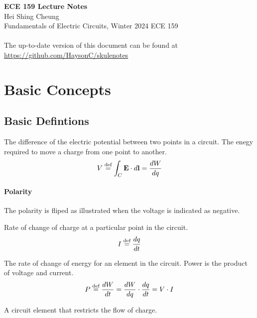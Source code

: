 \documentclass[11pt]{article}
\begin{document}
\thispagestyle{empty}
{\LARGE \bf ECE 159 Lecture Notes}\\
{\large Hei Shing Cheung}\\
Fundamentals of Electric Circuits, Winter 2024 \hfill ECE 159\\
\\
The up-to-date version of this document can be found at \url{https://github.com/HaysonC/skulenotes}\\

\vspace{10pt}
\section{Basic Concepts}
\subsection{Basic Defintions}
\begin{definition}[Voltage]
    The difference of the electric potential between two points in a circuit. The enegy required to move a charge from one point to another.
    \begin{equation}
        V \stackrel{\text{def}}{=} \int_C \textbf{E} \cdot d\textbf{l} = \frac{dW}{dq}
    \end{equation}
    \end{definition}
    \paragraph{Polarity} The polarity is fliped as illustrated when the voltage is indicated as negative.
    \begin{definition}[Current]
    Rate of change of charge at a particular point in the circuit.
    \begin{equation}
        I \stackrel{\text{def}}{=} \frac{dq}{dt}
    \end{equation}
    \end{definition}
    
    \begin{definition}[Power]
    The rate of change of energy for an element in the circuit. Power is the product of voltage and current.
    \begin{equation}
        P \stackrel{\text{def}}{=} \frac{dW}{dt} = \frac{dW}{dq} \cdot \frac{dq}{dt} = V \cdot I
    \end{equation}
    \end{definition}
    
    \begin{definition}[Resistors]
    A circuit element that restricts the flow of charge.
    \end{definition}
    
\end{document}
